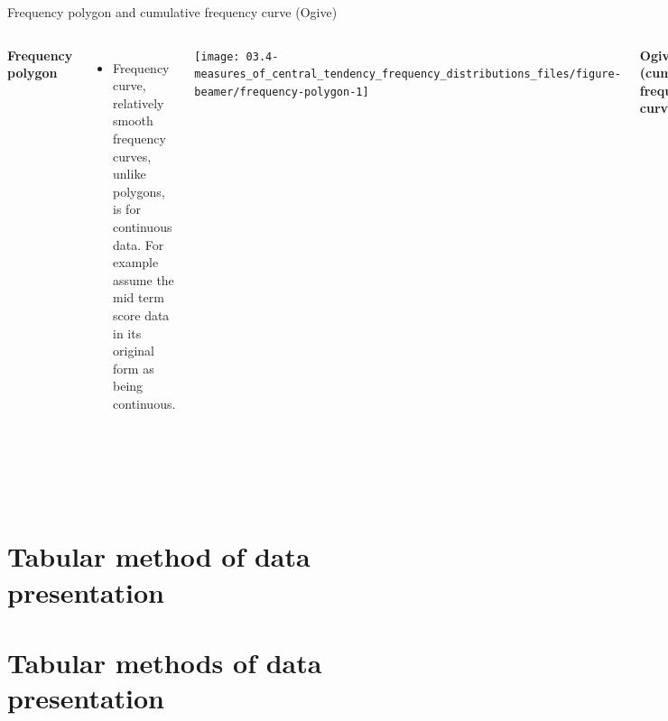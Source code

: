 \documentclass[
  ignorenonframetext,
  aspectratio=169]{beamer}
\begin{document}
\begin{frame}{Frequency polygon and cumulative frequency curve (Ogive)}
\protect\hypertarget{frequency-polygon-and-cumulative-frequency-curve-ogive}{}
\begin{columns}[T, onlytextwidth]

\textbf{Frequency polygon}

\begin{itemize}
\footnotesize
\item Frequency curve, relatively smooth frequency curves, unlike polygons, is for continuous data. For example assume the mid term score data in its original form as being continuous.
\end{itemize}


\texttt{[image: 03.4-measures\_of\_central\_tendency\_frequency\_distributions\_files/figure-beamer/frequency-polygon-1]} 


\textbf{Ogives (cumulative frequency curves)}

\begin{figure}
\texttt{[image: 03.4-measures\_of\_central\_tendency\_frequency\_distributions\_files/figure-beamer/cumulative-frequency-curve-1]} \caption{Cumulative frequency curve fitted to the mid-term score distribution}\label{fig:cumulative-frequency-curve}
\end{figure}

\begin{itemize}
\scriptsize
\item In the discrete frequency distribution, above, height of the bar shows relative frequency of each class.
\item When we use the height as the relative frequency if the interval lengths are unequal, histogram may not appropriately display the frequency distribution.
\end{itemize}
\end{columns}
\end{frame}

\hypertarget{tabular-method-of-data-presentation}{%
\section{Tabular method of data
presentation}\label{tabular-method-of-data-presentation}}

\hypertarget{tabular-methods-of-data-presentation}{%
\section{Tabular methods of data
presentation}\label{tabular-methods-of-data-presentation}}
\end{document}
